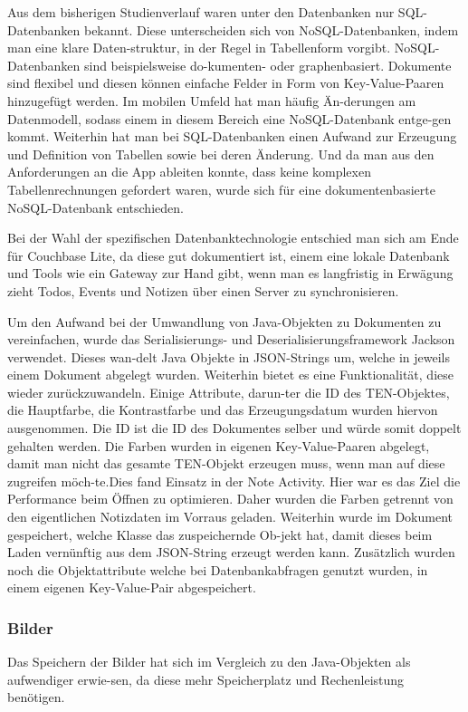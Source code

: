 Aus dem bisherigen Studienverlauf waren unter den Datenbanken nur SQL-Datenbanken bekannt. Diese unterscheiden sich von NoSQL-Datenbanken, indem man eine klare Daten-struktur, in der Regel in Tabellenform vorgibt. NoSQL-Datenbanken sind beispielsweise do-kumenten- oder graphenbasiert. Dokumente sind flexibel und diesen können einfache Felder in Form von Key-Value-Paaren hinzugefügt werden. Im mobilen Umfeld hat man häufig Än-derungen am Datenmodell, sodass einem in diesem Bereich eine NoSQL-Datenbank entge-gen kommt. Weiterhin hat man bei SQL-Datenbanken einen Aufwand zur Erzeugung und Definition von Tabellen sowie bei deren Änderung. Und da man aus den Anforderungen an die App ableiten konnte, dass keine komplexen Tabellenrechnungen gefordert waren, wurde sich für eine dokumentenbasierte NoSQL-Datenbank entschieden. 

Bei der Wahl der spezifischen Datenbanktechnologie entschied man sich am Ende für Couchbase Lite, da diese gut dokumentiert ist, einem eine lokale Datenbank und Tools wie ein Gateway zur Hand gibt, wenn man es langfristig in Erwägung zieht Todos, Events und Notizen über einen Server zu synchronisieren.

Um den Aufwand bei der Umwandlung von Java-Objekten zu Dokumenten zu vereinfachen, wurde das Serialisierungs- und Deserialisierungsframework Jackson verwendet. Dieses wan-delt Java Objekte in JSON-Strings um, welche in jeweils einem Dokument abgelegt wurden. Weiterhin bietet es eine Funktionalität, diese wieder zurückzuwandeln. Einige Attribute, darun-ter die ID des TEN-Objektes, die Hauptfarbe, die Kontrastfarbe und das Erzeugungsdatum wurden hiervon ausgenommen. Die ID ist die ID des Dokumentes selber und würde somit doppelt gehalten werden. Die Farben wurden in eigenen Key-Value-Paaren abgelegt, damit man nicht das gesamte TEN-Objekt erzeugen muss, wenn man auf diese zugreifen möch-te.Dies fand Einsatz in der Note Activity. Hier war es das Ziel die Performance beim Öffnen zu optimieren. Daher wurden die Farben getrennt von den eigentlichen Notizdaten im Vorraus geladen. Weiterhin wurde im Dokument gespeichert, welche Klasse das zuspeichernde Ob-jekt hat, damit dieses beim Laden vernünftig aus dem JSON-String erzeugt werden kann. Zusätzlich wurden noch die Objektattribute welche bei Datenbankabfragen genutzt wurden, in einem eigenen Key-Value-Pair abgespeichert.

\subsubsection{Bilder}
Das Speichern der Bilder hat sich im Vergleich zu den Java-Objekten als aufwendiger erwie-sen, da diese mehr Speicherplatz und Rechenleistung benötigen.

